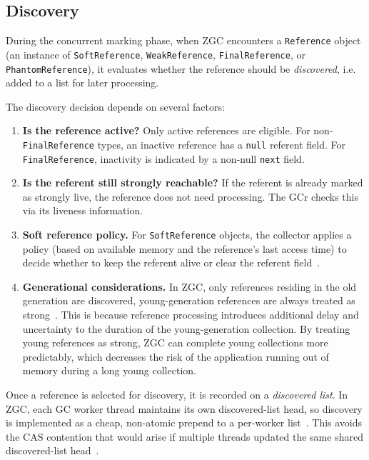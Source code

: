 \subsection{Discovery}
\label{subsec:bg-refproc-discovery}

During the concurrent marking phase, when \ac{ZGC} encounters a \texttt{Reference} object (an instance of \texttt{SoftReference}, \texttt{WeakReference}, \texttt{FinalReference}, or \texttt{PhantomReference}), it evaluates whether the reference should be \emph{discovered}, i.e. added to a list for later processing.

The discovery decision depends on several factors:

\begin{enumerate}
    \item \textbf{Is the reference active?} Only active references are eligible. For non-\texttt{FinalReference} types, an inactive reference has a \texttt{null} referent field. For \texttt{FinalReference}, inactivity is indicated by a non-null \texttt{next} field.
    \item \textbf{Is the referent still strongly reachable?} If the referent is already marked as strongly live, the reference does not need processing. The \ac{GCr} checks this via its liveness information.
    \item \textbf{Soft reference policy.} For \texttt{SoftReference} objects, the collector applies a policy (based on available memory and the reference's last access time) to decide whether to keep the referent alive or clear the referent field~\cite{openjdk-referenceprocessor-cpp,openjdk-referencepolicy-cpp}.
    \item \textbf{Generational considerations.} In \ac{ZGC}, only references residing in the old generation are discovered, young-generation references are always treated as strong~\cite{jep439-genzgc,openjdk-zreferenceprocessor-cpp}. This is because reference processing introduces additional delay and uncertainty to the duration of the young-generation collection. By treating young references as strong, \ac{ZGC} can complete young collections more predictably, which decreases the risk of the application running out of memory during a long young collection. 
\end{enumerate}

Once a reference is selected for discovery, it is recorded on a \emph{discovered list}. In \ac{ZGC}, each \ac{GC} worker thread maintains its own discovered-list head, so discovery is implemented as a cheap, non-atomic prepend to a per-worker list~\cite{openjdk-zreferenceprocessor-cpp}. This avoids the \ac{CAS} contention that would arise if multiple threads updated the same shared discovered-list head~\cite{openjdk-referenceprocessor-cpp}.

